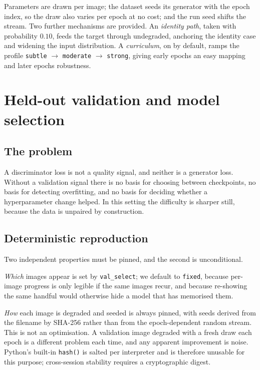 \documentclass[11pt,a4paper]{article}
\newcommand{\code}[1]{\texttt{#1}}
\begin{document}
Parameters are drawn per image; the dataset seeds its generator with the epoch
index, so the draw also varies per epoch at no cost; and the run seed shifts the
stream. Two further mechanisms are provided. An \emph{identity path}, taken with
probability $0.10$, feeds the target through undegraded, anchoring the identity
case and widening the input distribution. A \emph{curriculum}, on by default,
ramps the profile \code{subtle} $\rightarrow$ \code{moderate} $\rightarrow$
\code{strong}, giving early epochs an easy mapping and later epochs robustness.

\section{Held-out validation and model selection}
\label{sec:val}

\subsection{The problem}

A discriminator loss is not a quality signal, and neither is a generator loss.
Without a validation signal there is no basis for choosing between checkpoints, no
basis for detecting overfitting, and no basis for deciding whether a
hyperparameter change helped. In this setting the difficulty is sharper still,
because the data is unpaired by construction.

\subsection{Deterministic reproduction}

Two independent properties must be pinned, and the second is unconditional.

\emph{Which} images appear is set by \code{val\_select}; we default to
\code{fixed}, because per-image progress is only legible if the same images
recur, and because re-showing the same handful would otherwise hide a model that
has memorised them.

\emph{How} each image is degraded and seeded is always pinned, with seeds derived
from the filename by SHA-256 rather than from the epoch-dependent random stream.
This is not an optimisation. A validation image degraded with a fresh draw each
epoch is a different problem each time, and any apparent improvement is noise.
Python's built-in \code{hash()} is salted per interpreter and is therefore
unusable for this purpose; cross-session stability requires a cryptographic
digest.
\end{document}
